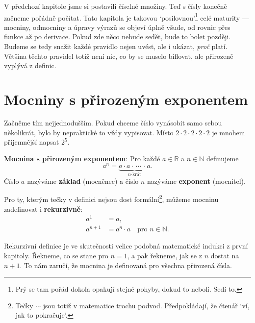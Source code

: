 \label{kap:vyrazy}

V předchozí kapitole jsme si postavili číselné množiny. Teď s čísly konečně začneme pořádně počítat. Tato kapitola je takovou `posilovnou'\footnote{Prý se tam pořád dokola opakují stejné pohyby, dokud to nebolí. Sedí to.} celé maturity --- mocniny, odmocniny a úpravy výrazů se objeví úplně všude, od rovnic přes funkce až po derivace. Pokud zde něco nebude sedět, bude to bolet později. Budeme se tedy snažit každé pravidlo nejen uvést, ale i ukázat, \textit{proč} platí. Většina těchto pravidel totiž není nic, co by se muselo biflovat, ale přirozeně vyplývá z definic.

\section{Mocniny s přirozeným exponentem}

Začněme tím nejjednodušším. Pokud chceme číslo vynásobit samo sebou několikrát, bylo by nepraktické to vždy vypisovat. Místo $2\cdot 2\cdot 2\cdot 2\cdot 2$ je mnohem příjemnější napsat $2^5$.

\begin{definitionbox}
  \textbf{Mocnina s přirozeným exponentem}: Pro každé $a\in\mathbb{R}$ a $n\in\mathbb{N}$ definujeme
  \begin{equation*}
    a^n = \underbrace{a\cdot a\cdot\ \cdots\ \cdot a}_{n\text{-krát}}.
  \end{equation*}
  Číslo $a$ nazýváme \textbf{základ} (mocněnec) a číslo $n$ nazýváme \textbf{exponent} (mocnitel).

  \vspace{0.2cm}

  Pro ty, kterým tečky v definici nejsou dost formální\footnote{Tečky $\cdots$ jsou totiž v matematice trochu podvod. Předpokládají, že čtenář `ví, jak to pokračuje'.}, můžeme mocninu zadefinovat i \textbf{rekurzivně}:
  \begin{align*}
    a^1 &= a,\\
    a^{n+1} &= a^n\cdot a \quad\text{pro } n\in\mathbb{N}.
  \end{align*}
\end{definitionbox}

Rekurzivní definice je ve skutečnosti velice podobná matematické indukci z první kapitoly. Řekneme, co se stane pro $n = 1$, a pak řekneme, jak se z $n$ dostat na $n+1$. To nám zaručí, že mocnina je definovaná pro všechna přirozená čísla.


